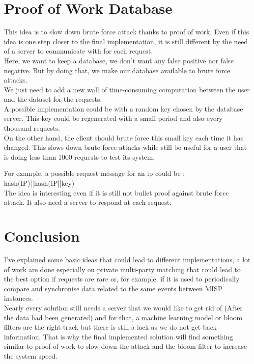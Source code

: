 \documentclass{eplmastersthesis}
\begin{document}
\section{Proof of Work Database}
This idea is to slow down brute force attack thanks to proof of work. Even if this idea is one step closer to the final implementation, it is still different by the need of a server to communicate with for each request.\\

Here, we want to keep a database, we don't want any false positive nor false negative. But by doing that, we make our database available to brute force attacks.\\
We just need to add a new wall of time-consuming computation between the user and the dataset for the requests.\\

A possible implementation could be with a random key chosen by the database server. This key could be regenerated with a small period and also every thousand requests.\\
On the other hand, the client should brute force this small key each time it has changed. This slows down brute force attacks while still be useful for a user that is doing less than 1000 requests to test its system.

For example, a possible request message for an ip could be : hash(IP)||hash(IP||key)\\

The idea is interesting even if it is still not bullet proof against brute force attack. It also need a server to respond at each request.

\section{Conclusion}
I've explained some basic ideas that could lead to different implementations, a lot of work are done especially on private multi-party matching that could lead to the best option if requests are rare or, for example, if it is used to periodically compare and synchronise data related to the same events between MISP instances.\\
Nearly every solution still needs a server that we would like to get rid of (After the data had been generated) and for that, a machine learning model or bloom filters are the right track but there is still a lack as we do not get back information. That is why the final implemented solution will find something similar to proof of work  to slow down the attack and the bloom filter to increase the system speed.
\end{document}
